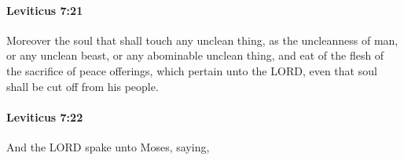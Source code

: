		\paragraph{Leviticus 7:21} %
			\label{LEVITICUS-7-21}

			Moreover the soul that shall touch any unclean thing, as the uncleanness of man, or any unclean beast, or any abominable unclean thing, and eat of the flesh of the sacrifice of peace offerings, which pertain unto the LORD, even that soul shall be cut off from his people.


		\paragraph{Leviticus 7:22} %
			\label{LEVITICUS-7-22}

			And the LORD spake unto Moses, saying,


